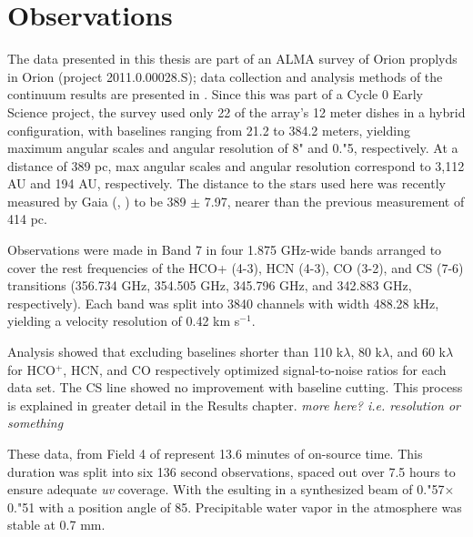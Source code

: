 \chapter{Observations}
\label{chap:observations}

The data presented in this thesis are part of an ALMA survey of Orion proplyds in Orion (project 2011.0.00028.S); data collection and analysis methods of the continuum results are presented in \citet{mann_alma_2014}. Since this was part of a Cycle 0 Early Science project, the survey used only 22 of the array's 12 meter dishes in a hybrid configuration, with baselines ranging from 21.2 to 384.2 meters, yielding maximum angular scales and angular resolution of 8" and 0."5, respectively. At a distance of 389 pc, max angular scales and angular resolution correspond to 3,112 AU and 194 AU, respectively. The distance to the stars used here was recently measured by Gaia (\citet{gaia_collaboration_gaia_2016}, \citet{gaia_collaboration_gaia_2018}) to be 389 $\pm$ 7.97, nearer than the previous measurement of 414 pc.
\bigskip

Observations were made in Band 7 in four 1.875 GHz-wide bands arranged to cover the rest frequencies of the HCO+ (4-3), HCN (4-3), CO (3-2), and CS (7-6) transitions (356.734 GHz, 354.505 GHz, 345.796 GHz, and 342.883 GHz, respectively). Each band was split into 3840 channels with width 488.28 kHz, yielding a velocity resolution of 0.42 km s$^{-1}$.

\bigskip





Analysis showed that excluding baselines shorter than 110 k$\lambda$, 80 k$\lambda$, and 60 k$\lambda$ for HCO$^{+}$, HCN, and CO respectively optimized signal-to-noise ratios for each data set. The CS line showed no improvement with baseline cutting. This process is explained in greater detail in the Results chapter. \textit{more here? i.e. resolution or something}



These data, from Field 4 of \citet{mann_alma_2014} represent 13.6 minutes of on-source time. This duration was split into six 136 second observations, spaced out over 7.5 hours to ensure adequate \textit{uv} coverage. With the esulting in a synthesized beam of 0."57$\times$0."51 with a position angle of 85\degree. Precipitable water vapor in the atmosphere was stable at 0.7 mm.


